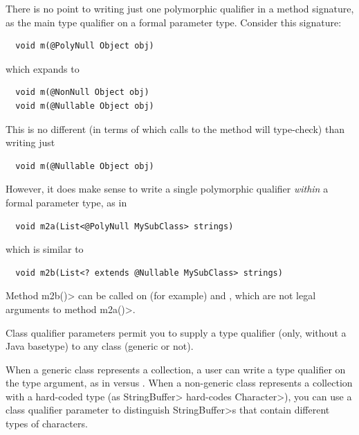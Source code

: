 
There is no point to writing just one polymorphic qualifier in a method
signature, as the main type qualifier on a formal parameter type.
Consider this signature:

\begin{Verbatim}
  void m(@PolyNull Object obj)
\end{Verbatim}

\noindent
which expands to

\begin{Verbatim}
  void m(@NonNull Object obj)
  void m(@Nullable Object obj)
\end{Verbatim}

This is no different (in terms of which calls to the method will
type-check) than writing just

\begin{Verbatim}
  void m(@Nullable Object obj)
\end{Verbatim}

However, it does make sense to write a single polymorphic qualifier
\emph{within} a formal parameter type, as in
\begin{Verbatim}
  void m2a(List<@PolyNull MySubClass> strings)
\end{Verbatim}
which is similar to
\begin{Verbatim}
  void m2b(List<? extends @Nullable MySubClass> strings)
\end{Verbatim}
Method \<m2b()> can be called on (for example)  and , which are not legal
arguments to method \<m2a()>.



Class qualifier parameters permit you to supply a type qualifier (only,
without a Java basetype) to any class (generic or not).

When a generic class represents a collection, a user can write a type
qualifier on the type argument, as in 
versus .  When a non-generic class
represents a collection with a hard-coded type (as \<StringBuffer>
hard-codes \<Character>), you can use a class qualifier parameter to
distinguish \<StringBuffer>s that contain different types of characters.


